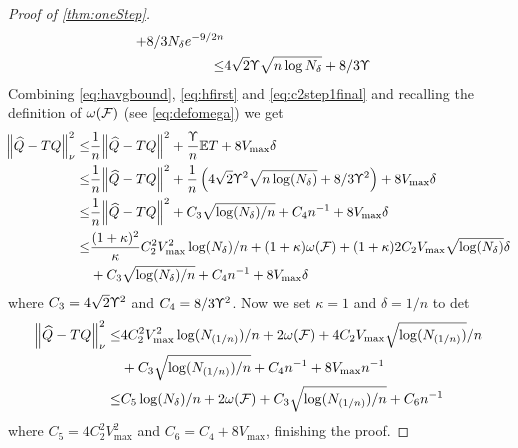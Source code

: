 \begin{proof}[Proof of \cref{thm:oneStep}]
\begin{align}
    + 8/3 N_\delta e^{-9/2 n}
    \\ \leq & 4 \sqrt{2} \Upupsilon \sqrt{n \log N_\delta} + 8/3 \Upupsilon
    \label{eq:ETbound}
  \end{align}
  Combining \cref{eq:havgbound}, \cref{eq:hfirst} and \cref{eq:c2step1final}
  and recalling the definition of $\omega(\mathcal{F})$ (see \cref{eq:defomega})
  we get
  \begin{align}
    \norm{\widehat{Q} - TQ}^2_\nu
    \leq & \frac{1}{n} \norm{\widehat{Q} - TQ}^2 + \frac{\Upupsilon}{n} \mathbb{E} T
    + 8 V_{\max} \delta
    \\ \leq & \frac{1}{n} \norm{\widehat{Q} - TQ}^2 + \frac{1}{n}
    \left(4\sqrt{2} \Upupsilon^2 \sqrt{n \log(N_\delta)} + 8/3 \Upupsilon^2 \right)
    + 8 V_{\max} \delta
    \\ \leq & \frac{1}{n} \norm{\widehat{Q} - TQ}^2
    + C_3 \sqrt{\log(N_\delta)/n} + C_4 n^{-1}
    + 8 V_{\max} \delta
    \\ \leq & \frac{(1 + \kappa)^2}{\kappa} C_2^2 V_{\max}^2 \log(N_\delta)/n
    + (1 + \kappa) \omega(\mathcal{F}) + (1 + \kappa) 2 C_2 V_{\max}
    \sqrt{\log(N_\delta)} \delta
    \notag
    \\ & + C_3 \sqrt{\log(N_\delta)/n} + C_4 n^{-1}
    + 8 V_{\max} \delta
   \label{eq:C2final}
  \end{align}
  where $C_3 = 4\sqrt{2} \Upupsilon^2$ and $C_4 = 8/3 \Upupsilon^2$.
  Now we set $\kappa = 1$ and $\delta = 1/n$ to det
  \begin{align}
    \norm{\widehat{Q} - TQ}_\nu^2
    \leq & 4 C_2^2 V_{\max}^2 \log(N_{(1/n)})/n
    + 2 \omega(\mathcal{F}) + 4 C_2 V_{\max}
    \sqrt{\log(N_{(1/n)})}/n
    \notag
    \\ & + C_3 \sqrt{\log(N_{(1/n)})/n} + C_4 n^{-1}
    + 8 V_{\max} n^{-1} 
    \\
    \leq & C_5 \log(N_\delta)/n
    + 2 \omega(\mathcal{F})
    + C_3 \sqrt{\log(N_{(1/n)})/n} + C_6 n^{-1}
  \end{align}
  where $C_5 = 4 C_2^2 V_{\max}^2$ and $C_6 = C_4 + 8 V_{\max}$,
  finishing the proof.
\end{proof}



